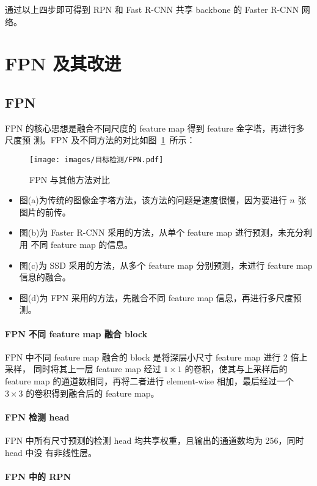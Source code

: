 通过以上四步即可得到 RPN 和 Fast R-CNN 共享 backbone 的 Faster R-CNN 网络。

\section{FPN 及其改进}
\label{sec:FPN}

\subsection{FPN}
FPN 的核心思想是融合不同尺度的 feature map 得到 feature 金字塔，再进行多尺度预
测。FPN 及不同方法的对比如图~\ref{fig:FPN}~所示：

\begin{figure}[ht]
  \centering
  \texttt{[image: images/目标检测/FPN.pdf]}
  \caption{FPN 与其他方法对比}
  \label{fig:FPN}
\end{figure}

\begin{itemize}
  \item 图(a)为传统的图像金字塔方法，该方法的问题是速度很慢，因为要进行 $n$ 张
    图片的前传。
  \item 图(b)为 Faster R-CNN 采用的方法，从单个 feature map 进行预测，未充分利用
    不同 feature map 的信息。
  \item 图(c)为 SSD 采用的方法，从多个 feature map 分别预测，未进行 feature map 信息的融合。
  \item 图(d)为 FPN 采用的方法，先融合不同 feature map 信息，再进行多尺度预测。
\end{itemize}

\paragraph{FPN 不同 feature map 融合 block}
FPN 中不同 feature map 融合的 block 是将深层小尺寸 feature map 进行 2 倍上采样，
同时将其上一层 feature map 经过 $1 \times 1$ 的卷积，使其与上采样后的 feature
map 的通道数相同，再将二者进行 element-wise 相加，最后经过一个 $3 \times 3$
的卷积得到融合后的 feature map。

\paragraph{FPN 检测 head}
FPN 中所有尺寸预测的检测 head 均共享权重，且输出的通道数均为 256，同时 head 中没
有非线性层。

\paragraph{FPN 中的 RPN}


